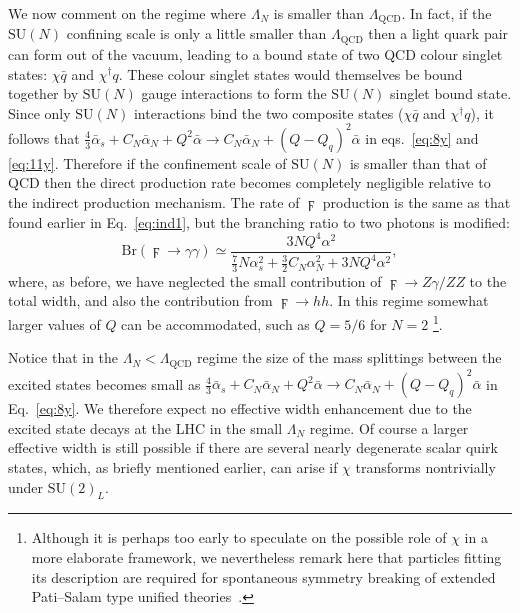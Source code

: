 We now comment on the regime where $\Lambda_{N}$ is smaller than
$\Lambda_{\text{QCD}}$. In fact, if the $\mathrm{SU}(N)$ confining scale is only a
little smaller than $\Lambda_{\text{QCD}}$ then a light quark pair can form out of the
vacuum, leading to a bound state of two QCD colour singlet states: $\chi \bar{q}$
and $\chi^\dagger q$. These colour singlet states would themselves be bound
together by $\mathrm{SU}(N)$ gauge interactions to form the $\mathrm{SU}(N)$
singlet bound state. Since only $\mathrm{SU}(N)$ interactions bind the two
composite states ($\chi \bar{q}$ and $\chi^\dagger q$), it follows that
$\frac{4}{3} \bar \alpha_s + C_{N} \bar{\alpha}_{N} + Q^2 \bar{\alpha} \to C_{N} \bar{\alpha}_{N} + (Q - Q_q)^2 \bar{\alpha}$
in eqs.~\ref{eq:8y} and \ref{eq:11y}. Therefore if the confinement scale of
$\mathrm{SU}(N)$ is smaller than that of QCD then the direct production rate
becomes completely negligible relative to the indirect production mechanism. The
rate of $\digamma$ production is the same as that found earlier in Eq.~\ref{eq:ind1},
but the branching ratio to two photons is modified:
\begin{equation}
  \text{Br}(\digamma \rightarrow \gamma \gamma) \simeq \frac{3NQ^4 \alpha^2}{\frac{7}{3}N\alpha_{s}^2
    + \frac{3}{2} C_{N} \alpha_{N}^2 + 3NQ^4\alpha^2},
\end{equation}
where, as before, we have neglected the small contribution of $\digamma \rightarrow
Z\gamma / ZZ$ to the total width, and also the contribution from $\digamma \rightarrow hh$.
In this regime somewhat larger values of $Q$ can be accommodated, such as $Q = 5/6$ for $N=2$ \footnote{
  Although it is perhaps too early to speculate on the possible role of $\chi$ in a more elaborate framework,
  we nevertheless remark here that particles fitting its description are required for spontaneous symmetry breaking of
  extended Pati--Salam type unified theories~\cite{Foot:1990ij}.}.


Notice that in the $\Lambda_{N} < \Lambda_{\text{QCD}}$ regime the
size of the mass splittings between the excited states becomes small as
$\frac{4}{3} \bar \alpha_s + C_{N} \bar{\alpha}_{N} + Q^2 \bar{\alpha} \to
C_{N} \bar{\alpha}_{N} + (Q - Q_q)^2 \bar{\alpha} $ in Eq.~\ref{eq:8y}. We therefore
expect no effective width enhancement due to the excited state decays at the LHC
in the small $\Lambda_{N}$ regime. Of course a larger effective width is still possible if there are
several nearly degenerate scalar quirk states, which, as briefly mentioned earlier,
can arise if $\chi$ transforms nontrivially under $\mathrm{SU}(2)_{L}$.


